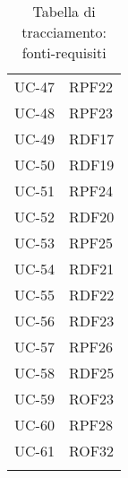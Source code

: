 \begin{longtable}{| p{5cm} | p{5cm} |}
		\rowcolor{LightGray}
		UC-47 & RPF22\\
		UC-48 & RPF23\\
		\rowcolor{LightGray}
		UC-49 & RDF17 \\
		UC-50 & RDF19 \\
		\rowcolor{LightGray}
		UC-51 & RPF24 \\
		UC-52 & RDF20 \\
		\rowcolor{LightGray}
		UC-53 & RPF25 \\
		UC-54 & RDF21 \\
		\rowcolor{LightGray}
		UC-55 & RDF22 \\
		UC-56 & RDF23 \\
		\rowcolor{LightGray}
		UC-57 & RPF26 \\
		UC-58 & RDF25\\
		\rowcolor{LightGray}
		UC-59 & ROF23\\
		UC-60 & RPF28\\
		\rowcolor{LightGray}
		UC-61 & ROF32\\
		\hline
		\caption{Tabella di tracciamento: fonti-requisiti}
\end{longtable}
\newpage
